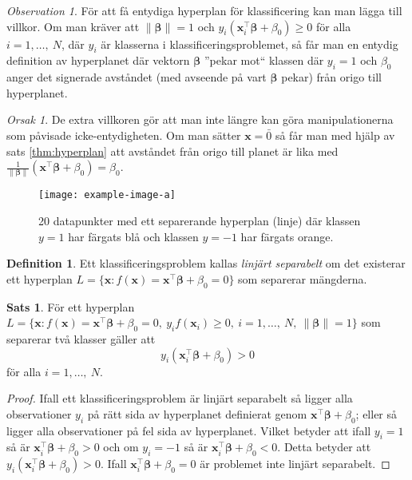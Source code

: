 \documentclass[a4paper, 12pt]{report}
\theoremstyle{definition}
\newtheorem{thm}{Sats}[section]
\newtheorem{defi}{Definition}[section]
\theoremstyle{remark}
\newtheorem*{rem}{Observation}
\newtheorem*{reas}{Orsak}
\newcommand{\bfbeta}{{\boldsymbol{\beta}}}
\newcommand{\sephyp}{\{ \mathbf{x} : f(\mathbf{x})=\mathbf{x}^\intercal \bfbeta + \beta_0=0\}}
\newcommand{\entsephyp}{\{ \mathbf{x} : f(\mathbf{x})=\mathbf{x}^\intercal \bfbeta + \beta_0=0,~y_if(\mathbf{x}_i)\geq0,~i=1,\dots,~N,~\|\bfbeta\|=1\}}
\begin{document}
\begin{rem}
	För att få entydiga hyperplan för klassificering kan man lägga till villkor. Om man kräver att $\|\bfbeta\|=1$ och $y_i(\mathbf{x}_i^\intercal\bfbeta + \beta_0)\geq0$ för alla $i=1,\dots,~N$, där $y_i$ är klasserna i klassificeringsproblemet, så får man en entydig definition av hyperplanet där vektorn $\bfbeta$ ''pekar mot`` klassen där $y_i=1$ och $\beta_0$ anger det signerade avståndet (med avseende på vart $\bfbeta$ pekar) från origo till hyperplanet.
\end{rem}
\begin{reas}
	De extra villkoren gör att man inte längre kan göra manipulationerna som påvisade icke-entydigheten. Om man sätter $\mathbf{x}=\bar{0}$ så får man med hjälp av sats \ref{thm:hyperplan} att avståndet från origo till planet är lika med $\frac{1}{\|\bfbeta\|}(\mathbf{x}^\intercal\bfbeta+\beta_0)=\beta_0$.
\end{reas}

\begin{figure}
\centering
\texttt{[image: example-image-a]}
\caption{\label{fig:separatinghyperplane}20 datapunkter med ett separerande hyperplan (linje) där klassen $y=1$ har färgats blå och klassen $y=-1$ har färgats orange.}
\end{figure}

\begin{defi}
	Ett klassificeringsproblem kallas \textit{linjärt separabelt} om det existerar ett hyperplan $L=\sephyp$ som separerar mängderna.
\end{defi}

\begin{thm}
	För ett hyperplan $L=\entsephyp$ som separerar två klasser gäller att
	\begin{equation}
		y_i(\mathbf{x}_i^\intercal \bfbeta + \beta_0) > 0
	\end{equation}
	för alla $i = 1, \dots,~N$.
\end{thm}
\begin{proof}
	Ifall ett klassificeringsproblem är linjärt separabelt så ligger alla observationer $y_i$ på rätt sida av hyperplanet definierat genom $\mathbf{x}^\intercal \bfbeta + \beta_0$; eller så ligger alla observationer på fel sida av hyperplanet. Vilket betyder att ifall $y_i=1$ så är $\mathbf{x}_i^\intercal \bfbeta + \beta_0 > 0$ och om $y_i=-1$ så är $\mathbf{x}_i^\intercal \bfbeta + \beta_0 < 0$. Detta betyder att $y_i(\mathbf{x}_i^\intercal \bfbeta + \beta_0) > 0$. Ifall $\mathbf{x}_i^\intercal \bfbeta + \beta_0 = 0$ är problemet inte linjärt separabelt.
\end{proof}
\end{document}
